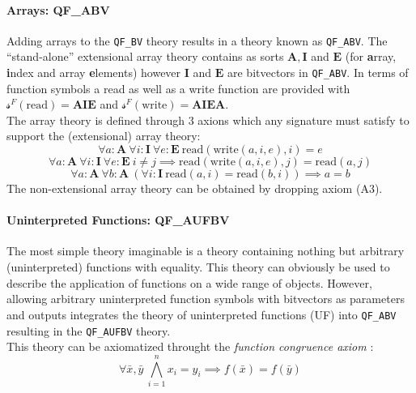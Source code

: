 \paragraph{Arrays: QF\_ABV}
Adding arrays to the \texttt{QF\_BV} theory results in a theory known as \texttt{QF\_ABV}. The \enquote{stand-alone} extensional array theory contains as sorts $\mathbf{A},\mathbf{I}$ and $\mathbf{E}$ (for \textbf{a}rray, \textbf{i}ndex and array \textbf{e}lements) however $\mathbf{I}$ and $\mathbf{E}$ are bitvectors in \texttt{QF\_ABV}. In terms of function symbols a read as well as a write function are provided with $\mathcal{s}^F(\text{read})=\mathbf{A}\mathbf{I}\mathbf{E}$ and $\mathcal{s}^F(\text{write})=\mathbf{A}\mathbf{I}\mathbf{E}\mathbf{A}$.\\
The array theory is defined through 3 axions which any signature must satisfy to support the (extensional) array theory:
\begin{equation}
    \tag{A1}
    \label{eq:preliminaries:smt:a1}
    \forall a\colon\!\textbf{A}\ \forall i\colon\!\textbf{I}\ \forall e\colon\!\textbf{E}\ 
    \text{read}\left(\text{write}\left(a,i,e\right), i\right) = e
\end{equation}
\begin{equation}
    \tag{A2}
    \label{eq:preliminaries:smt:a2}
    \forall a\colon\!\textbf{A}\ \forall i\colon\!\textbf{I}\ \forall e\colon\!\textbf{E}\ 
    i \neq j \implies \text{read}\left(\text{write}\left(a,i,e\right), j\right)
    = \text{read}\left(a,j\right)
\end{equation}
\begin{equation}
    \tag{A3}
    \label{eq:preliminaries:smt:a3}
    \forall a\colon\!\textbf{A}\ \forall b\colon\!\textbf{A}\ 
    \left( \forall i\colon\!\textbf{I}\ \text{read}\left(a,i\right) = \text{read}\left(b,i\right) \right)
    \implies
    a=b
\end{equation}
The non-extensional array theory can be obtained by dropping axiom (A3).

\paragraph{Uninterpreted Functions: QF\_AUFBV}
The most simple theory imaginable is a theory containing nothing but arbitrary (uninterpreted) functions with equality. This theory can obviously be used to describe the application of functions on a wide range of objects. However, allowing arbitrary uninterpreted function symbols with bitvectors as parameters and outputs integrates the theory of uninterpreted functions (UF) into \texttt{QF\_ABV} resulting in the \texttt{QF\_AUFBV} theory.\\
This theory can be axiomatized throught the \textit{function congruence axiom} \cite{PreinerNiemetzBiere-DIFTS13}:
\begin{equation}
    \tag{EUF}
    \label{eq:preliminaries:smt:euf}
    \forall \bar{x},\bar{y}\ \bigwedge\limits_{i=1}^n x_i=y_i \implies f\left(\bar{x}\right) = f\left(\bar{y}\right)
\end{equation}


